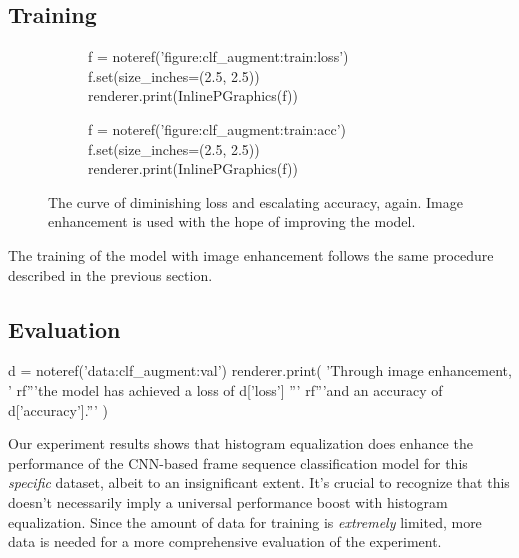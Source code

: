 \documentclass[letterpaper]{article} %
\begin{document}
\subsection{Training}
\begin{figure*}[t!]
  \centering
  \renewcommand\sffamily{}
  \begin{subfigure}[t]{.45\textwidth}
    \centering
    \begin{python}
      f = noteref('figure:clf_augment:train:loss')
      f.set(size_inches=(2.5, 2.5))
      renderer.print(InlinePGraphics(f))
    \end{python}
  \end{subfigure}
  \begin{subfigure}[t]{.45\textwidth}
    \centering
    \begin{python}
      f = noteref('figure:clf_augment:train:acc')
      f.set(size_inches=(2.5, 2.5))
      renderer.print(InlinePGraphics(f))
    \end{python}
  \end{subfigure}
  \caption{
    The curve of diminishing loss and escalating accuracy, again.
    Image enhancement is used with the hope of improving the model.
  }\label{figure:clf_augment:train}
\end{figure*}

The training of the model with image enhancement
follows the same procedure described in the previous section.

\subsection{Evaluation}
\begin{python}
  d = noteref('data:clf_augment:val')
  renderer.print(
    'Through image enhancement, '
    rf'''the model has achieved a loss of {d['loss']} ''' 
    rf'''and an accuracy of {d['accuracy']}.'''
  )
\end{python}

Our experiment results shows that 
histogram equalization does enhance 
the performance of the CNN-based frame sequence 
classification model for this \emph{specific} dataset, 
albeit to an insignificant extent. 
It's crucial to recognize that this doesn't 
necessarily imply a universal performance 
boost with histogram equalization.
Since the amount of data for training
is \emph{extremely} limited, more data is needed for
a more comprehensive evaluation of the experiment.
\end{document}
